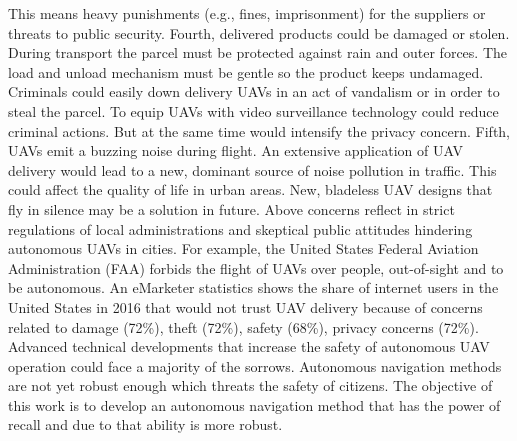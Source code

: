 This means heavy punishments (e.g., fines, imprisonment) for the suppliers or threats to public security.
Fourth, delivered products could be damaged or stolen.
During transport the parcel must be protected against rain and outer forces.
The load and unload mechanism must be gentle so the product keeps undamaged.
Criminals could easily down delivery UAVs in an act of vandalism or in order to steal the parcel.
To equip UAVs with video surveillance technology could reduce criminal actions.
But at the same time would intensify the privacy concern.
Fifth, UAVs emit a buzzing noise during flight.
An extensive application of UAV delivery would lead to a new, dominant source of noise pollution in traffic.
This could affect the quality of life in urban areas.
New, bladeless UAV designs that fly in silence may be a solution in future. \cite{Holt2017}
Above concerns reflect in strict regulations of local administrations and skeptical public attitudes hindering autonomous UAVs in cities.
For example, the United States Federal Aviation Administration (FAA) forbids the flight of UAVs over people,
out-of-sight and to be autonomous. \cite{DailyCaller2017}
An eMarketer statistics \cite{eMarketer2016} shows the share of internet users in the United States in 2016 
that would not trust UAV delivery because of concerns related to damage (72\%), theft (72\%), safety (68\%), privacy concerns (72\%).
Advanced technical developments that increase the safety of autonomous UAV operation could face a majority of the sorrows.
Autonomous navigation methods are not yet robust enough which threats the safety of citizens.
The objective of this work is to develop an autonomous navigation method
that has the power of recall and due to that ability is more robust.




%
%
%
%






